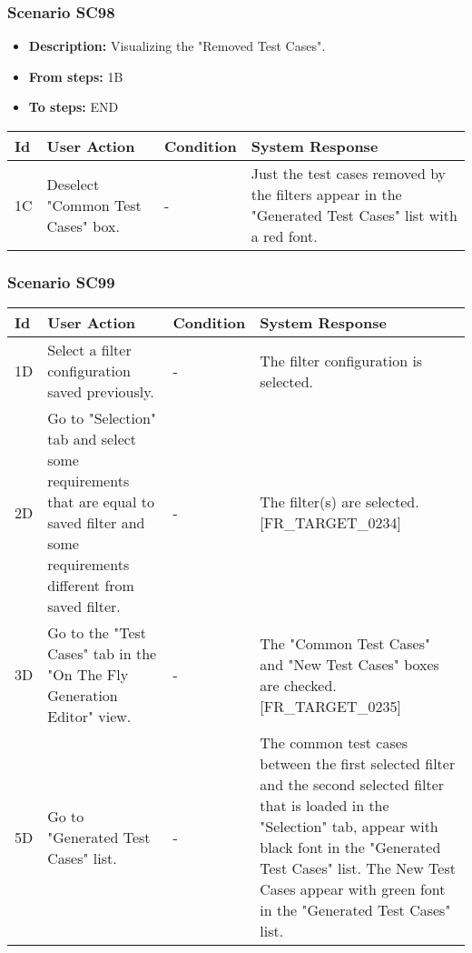 \documentclass[a4paper,11pt]{article}
\newcommand{\bl}{\\ \hline}
\begin{document}
\subsubsection*{Scenario SC98}
\begin{itemize}
\item {\bf Description:} Visualizing the "Removed Test Cases".
\item {\bf From steps:} 1B
\item {\bf To steps:} END
\end{itemize}
\begin{tabular}{|p{0.4in}|p{1.5in}|p{1.5in}|p{1.5in}|}
\hline
Id & User Action & Condition & System Response \bl 
1C & Deselect "Common Test Cases" box. & - & Just the test cases removed by the filters appear in the
						"Generated Test Cases" list with a red font.\bl
\end{tabular}
\subsubsection*{Scenario SC99}
\begin{tabular}{|p{0.4in}|p{1.5in}|p{1.5in}|p{1.5in}|}
\hline
Id & User Action & Condition & System Response \bl 
1D & Select a filter configuration saved previously. & - & The filter configuration is selected. \bl
2D & Go to "Selection" tab and select some requirements that are
						equal to saved filter and some requirements different from saved
						filter. & - & The filter(s) are selected. [FR_TARGET_0234]\bl
3D & Go to the "Test Cases" tab in the "On The Fly Generation
						Editor" view. & - & The "Common Test Cases" and "New Test Cases" boxes are
						checked. [FR_TARGET_0235] \bl
5D & Go to "Generated Test Cases" list.  & - & The common test cases between the first selected filter
						and the second selected filter that is loaded in the "Selection"
						tab, appear with black font in the "Generated Test Cases" list.
						The New Test Cases appear with green font in the "Generated Test
						Cases" list. \bl
\end{tabular}
\end{document}
